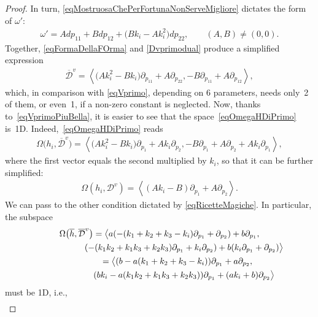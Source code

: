 \documentclass[10pt,a4paper]{amsart}
\newcommand{\D}{\mathcal{D}}
\newcommand{\Span}[1]{\left\langle #1 \right\rangle}
\numberwithin{equation}{section}
\begin{document}
\begin{proof}
In turn, \eqref{eqMostruosaChePerFortunaNonServeMigliore} dictates the form of
 $\omega'$:
\begin{gather}\label{eqFormaDellaFOrma}
\omega'=Adp_{11}+Bdp_{12}+\big(Bk_i-Ak_i^2\big)dp_{22}, \qquad (A,B)\neq (0,0).
\end{gather}
Together, \eqref{eqFormaDellaFOrma} and \eqref{Dvprimodual} produce a simplif\/ied expression
\begin{gather}\label{eqVprimoPiuBella}
 \overline{\D}^v=\Span{\big(Ak_i^2-Bk_i\big)\partial_{p_{11}}+A\partial_{p_{22}}, -B\partial_{p_{11}}+A\partial_{p_{12}}},
\end{gather}
which, in comparison with \eqref{eqVprimo}, depending on 6 parameters, needs only~2 of them, or even~1, if a non-zero constant is neglected.
Now, thanks to~\eqref{eqVprimoPiuBella}, it is easier to see that the space~\eqref{eqOmegaHDiPrimo} is~1D. Indeed,~\eqref{eqOmegaHDiPrimo} reads
\begin{gather*}
 \Omega\big(h_i,\overline{\D}^v\big) = \Span{\big(Ak_i^2-Bk_i\big)\partial_{p_{1}}+Ak_i\partial_{p_{2}},-B\partial_{p_{1}}+A\partial_{p_{2}}+Ak_i\partial_{p_{1}}},
\end{gather*}
where the f\/irst vector equals the second multiplied by $k_i$, so that it can be further simplif\/ied:
\begin{gather}\label{eqCheServiraDopo}
 \Omega(h_i, {\D}^v) = \Span{( Ak_i-B)\partial_{p_{1}}+A\partial_{p_{2}} }.
\end{gather}
We can pass to the other condition dictated by \eqref{eqRicetteMagiche}. In particular, the subspace
\begin{gather}
 \Omega\big(\overline{h},\overline{\D}^v\big) = \big\langle a (-(k_1+k_2+k_3-k_i) \partial_{p_{1}} + \partial_{p_{2}}) + b \partial_{p_{1}},\nonumber\\
\hphantom{\Omega\big(\overline{h},\overline{\D}^v\big) = \big\langle}{}
 (-(k_1k_2+k_1k_3+k_2k_3)\partial_{p_{1}}+k_i \partial_{p_{2}}) + b ( k_i \partial_{p_{1}}+ \partial_{p_{2}})\big\rangle\nonumber\\
\hphantom{\Omega\big(\overline{h},\overline{\D}^v\big) }{} = \big\langle (b-a(k_1+k_2+k_3-k_i)) \partial_{p_{1}} + a\partial_{p_{2}} ,\nonumber\\
\hphantom{\Omega\big(\overline{h},\overline{\D}^v\big) = \big\langle}{} (bk_i-a(k_1k_2+k_1k_3+k_2k_3))\partial_{p_{1}}+(ak_i+b) \partial_{p_{2}} \big\rangle\label{eqPrimoGeneratore}
\end{gather}
must be 1D, i.e.,
\begin{gather}\label{eqConProduttoria}

\end{gather}
\end{proof}
\end{document}

